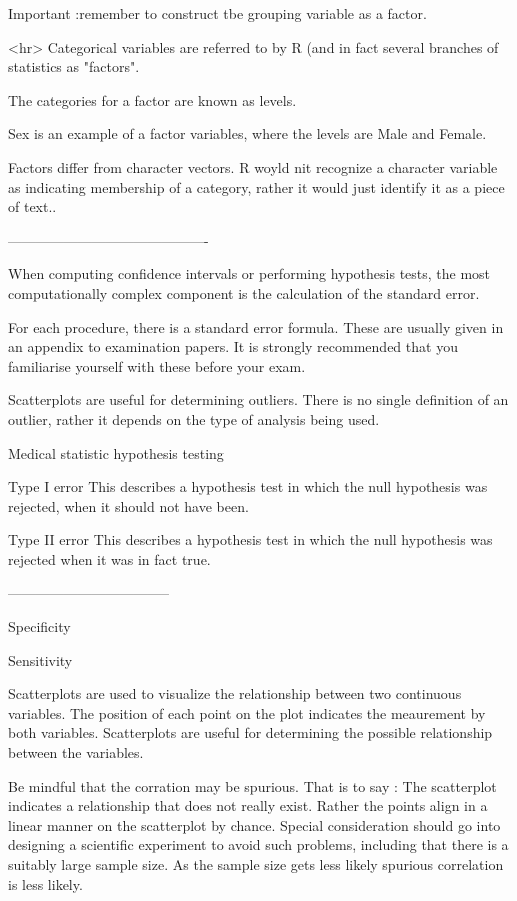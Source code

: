 Important :remember to construct tbe grouping variable as a factor. 


<hr>
Categorical variables are referred to by R (and in fact several branches of statistics as "factors". 

The categories for a factor are known as levels. 

Sex is an example of a factor variables, where the levels are Male and Female. 

Factors differ from character vectors. R woyld nit recognize a character variable as indicating membership of a category, rather it would just identify it as a piece of text..


 
-------------------------------------------

 
When computing confidence intervals or performing hypothesis tests, the most computationally complex component is the calculation of the standard error.
 
For each procedure, there is a standard error formula. These are usually given in an appendix to examination papers. It is strongly recommended that you familiarise yourself with these before your exam.



Scatterplots are useful for determining outliers. There is no single definition of an outlier, rather it depends on the type of analysis being used.


Medical statistic hypothesis testing
 
Type I error This describes a hypothesis test in which the null hypothesis was rejected, when it should not have been. 

Type II error This describes a hypothesis test in which the null hypothesis was rejected when it was in fact true.
 
-----------------------------------
 \begin{description}
 \item Specificity
 
\item Sensitivity
 \end{description}


Scatterplots are used to visualize the relationship between two continuous variables. The position of each point on the plot indicates the meaurement by both variables. Scatterplots are useful for determining the possible relationship between the variables.

Be mindful that the corration may be spurious. That is to say : The scatterplot indicates a relationship that does not really exist. Rather the points align in a linear manner on the scatterplot by chance. Special consideration should go into designing a scientific experiment to avoid such problems, including that there is a suitably large sample size. As the sample size gets less likely spurious correlation is less likely. 
